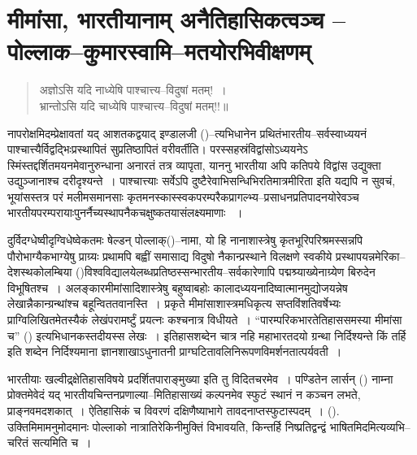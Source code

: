 
\chapter{मीमांसा, भारतीयानाम् अनैतिहासिकत्वञ्च – पोल्लाक–कुमारस्वामि–मतयोरभिवीक्षणम्}


\bgroup

\selectdev

\begin{verse}
अज्ञोऽसि यदि नाध्येषि पाश्चात्त्य–विदुषां मतम्!~।\\ भ्रान्तोऽसि यदि चाध्येषि पाश्चात्त्य–विदुषां मतम्!!॥
\end{verse}

\medskip

नापरोक्षमिदम्प्रेक्षावतां यद् आशतकद्वयाद् इण्डालजी ()–त्यभिधानेन प्रथितं\break भारतीय–सर्वस्वाध्ययनं पाश्चात्त्यैर्विद्वद्भिःप्रस्थापितं सुप्रतिष्ठापितं वरीवर्तीति। परस्सहस्रं\break विद्वांसोऽध्ययनेऽ स्मिंस्तद्दर्शितमयनमेवानुरुन्धाना अनारतं तत्र व्यापृता, याननु भारतीया अपि कतिपये विद्वांस उद्युक्ता उद्युञ्जानाश्च दरीदृश्यन्ते~। पाश्चात्त्याः सर्वेऽपि दुष्टैरेवाभिसन्धिभिरतिमात्रमीरिता इति यद्यपि न सुवचं, भूयांसस्तत्र परं मलीमसमानसाः कृतमनस्कास्स्वकपरम्परैक\-प्रागल्भ्य–प्रसाधनप्रतिपादनयोरेवञ्च भारतीयपरम्परायाःपुनर्नैच्यस्थापनैकचक्षुष्कतया\break संलक्ष्यमाणाः ~।

दुर्विदग्धेष्वीदृग्विधेष्वेकतमः षेल्डन् पोल्लाक्()–नामा, यो हि नानाशास्त्रेषु कृतभूरिपरिश्रमस्सन्नपि पौरोभाग्यैकभाग्येषु प्राग्र्यः प्रथामपि बह्वीं समासाद्य विदुषो नैकान्प्रस्थाने विलक्षणे स्वकीये प्रस्थापयन्नमेरिका–देशस्थकोलम्बिया ()विश्वविद्यालये\break लब्धप्रतिष्ठस्सन्भारतीय–सर्वकारेणापि पद्मश्र्याख्येनाग्र्येण बिरुदेन विभूषितश्च~। अलङ्कारमीमांसादिशास्त्रेषु बहुष्वाबहोः कालादध्ययनादिष्वात्मानमुद्योजयन्नेष लेखान्नैकान्ग्रन्थांश्च बहून्\break विततवानस्ति~। प्रकृते मीमांसाशास्त्रमधिकृत्य सप्तविंशतिवर्षेभ्यः प्राग्विलिखितमेतस्यैकं लेखं\break परामर्ष्टुं प्रयत्नः कश्चनात्र विधीयते~। “पारम्परिकभारतेतिहाससमस्या मीमांसा च” () इत्यभिधानकस्तदीयस्स लेखः~। इतिहासशब्देन चात्र नहि महाभारतदयो ग्रन्था निर्दिश्यन्ते किं तर्हि  इति शब्देन निर्दिश्यमाना ज्ञानशाखाऽधुनातनी प्राग्घटितावलिनिरूपणविमर्शनतात्पर्यवती~।

भारतीयाः खल्वीद्र्क्षेतिहासविषये प्रदर्शितपाराङ्मुख्या इति तु विदितचरमेव~। पण्डितेन लार्सन् () नाम्ना प्रोक्तमेवेदं यद् भारतीयचिन्तनप्रणाल्या–मितिहासाख्यं कल्पनमेव स्फुटं स्थानं न कञ्चन लभते, प्राङ्नवमदशकात्~। ऐतिहासिकं च विवरणं दक्षिणैष्याभागे तावदनाप्तस्फुटास्पदम्~। (). उक्तिमिमामनुमोदमानः पोल्लाको नात्रातिरेकिनीमुक्तिं विभावयति, किन्तर्हि निष्प्रतिद्वन्द्वं भाषितमिदमित्यव्यभि–चरितं सत्यमिति च~।

